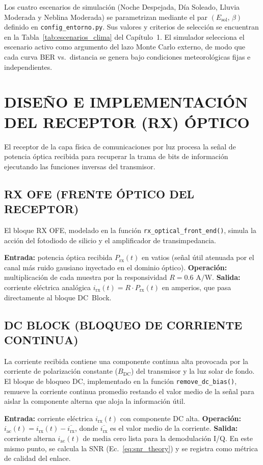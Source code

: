 Los cuatro escenarios de simulación (Noche Despejada, Día Soleado, Lluvia Moderada y Neblina Moderada) se parametrizan mediante el par $(E_{\text{sol}},\, \beta)$ definido en \texttt{config\_entorno.py}. Sus valores y criterios de selección se encuentran en la Tabla~\ref{tab:escenarios_clima} del Capítulo~1. El simulador selecciona el escenario activo como argumento del lazo Monte Carlo externo, de modo que cada curva BER vs.\ distancia se genera bajo condiciones meteorológicas fijas e independientes.



\section{DISEÑO E IMPLEMENTACIÓN DEL RECEPTOR (RX) ÓPTICO}
El receptor de la capa física de comunicaciones por luz procesa la señal de potencia óptica recibida para recuperar la trama de bits de información ejecutando las funciones inversas del transmisor.

\subsection{RX OFE (FRENTE ÓPTICO DEL RECEPTOR)}
El bloque RX OFE, modelado en la función \texttt{rx\_optical\_front\_end()}, simula la acción del fotodiodo de silicio y el amplificador de transimpedancia.

\textbf{Entrada:} potencia óptica recibida $P_{\text{rx}}(t)$ en vatios (señal útil atenuada por el canal más ruido gausiano inyectado en el dominio óptico). \textbf{Operación:} multiplicación de cada muestra por la responsividad $R = 0.6\text{ A/W}$. \textbf{Salida:} corriente eléctrica analógica $i_{\text{rx}}(t) = R \cdot P_{\text{rx}}(t)$ en amperios, que pasa directamente al bloque DC~Block.

\subsection{DC BLOCK (BLOQUEO DE CORRIENTE CONTINUA)}
La corriente recibida contiene una componente continua alta provocada por la corriente de polarización constante ($B_{\text{DC}}$) del transmisor y la luz solar de fondo. El bloque de bloqueo DC, implementado en la función \texttt{remove\_dc\_bias()}, remueve la corriente continua promedio restando el valor medio de la señal para aislar la componente alterna que aloja la información útil.

\textbf{Entrada:} corriente eléctrica $i_{\text{rx}}(t)$ con componente DC alta. \textbf{Operación:} $i_{\text{ac}}(t) = i_{\text{rx}}(t) - \overline{i_{\text{rx}}}$, donde $\overline{i_{\text{rx}}}$ es el valor medio de la corriente. \textbf{Salida:} corriente alterna $i_{\text{ac}}(t)$ de media cero lista para la demodulación I/Q. En este mismo punto, se calcula la SNR (Ec.~\ref{eq:snr_theory}) y se registra como métrica de calidad del enlace.

